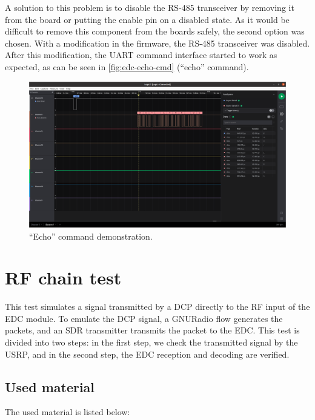 A solution to this problem is to disable the RS-485 transceiver by removing it from the board or putting the enable pin on a disabled state. As it would be difficult to remove this component from the boards safely, the second option was chosen. With a modification in the firmware, the RS-485 transceiver was disabled. After this modification, the UART command interface started to work as expected, as can be seen in \autoref{fig:edc-echo-cmd} (``echo'' command).

\begin{figure}[!ht]
    \begin{center}
        \includegraphics[width=\textwidth]{figures/edc_report/echo-cmd}
        \caption{``Echo'' command demonstration.}
        \label{fig:edc-echo-cmd}
    \end{center}
\end{figure}

\section{RF chain test}

This test simulates a signal transmitted by a DCP directly to the RF input of the EDC module. To emulate the DCP signal, a GNURadio flow generates the packets, and an SDR transmitter transmits the packet to the EDC. This test is divided into two steps: in the first step, we check the transmitted signal by the USRP, and in the second step, the EDC reception and decoding are verified.

\subsection{Used material}

The used material is listed below:

